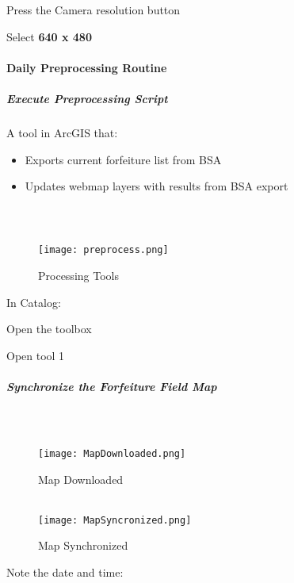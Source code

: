 \documentclass[class=article , crop=false, titlepage, twoside, multi={itemize, figure, verbatim}, float=false]{standalone}
\begin{document}
\noindent Press the \Large Camera resolution \normalsize button\\
\vspace{3in}

\noindent Select \textbf{\LARGE 640 x 480}\\
\clearpage
\paragraph{Daily Preprocessing Routine}

\subparagraph{Execute Preprocessing Script}A tool in ArcGIS that:

\begin{itemize}

\item Exports current forfeiture list from BSA
\item Updates webmap layers with results from BSA export

\end{itemize}

\subparagraph*{\\}
\begin{wrapfigure}{r}{0.75\textwidth}
\centering
\texttt{[image: preprocess.png]}
\caption{Processing Tools}
\end{wrapfigure}
In Catalog:\\
\vspace{1in}

\noindent Open the toolbox\\
\vspace{1in}

\noindent Open tool 1\\


\clearpage
\subparagraph{Synchronize the Forfeiture Field Map\\}

\subparagraph*{\texorpdfstring{\\}{}}
\begin{wrapfigure}{r}{0.5\textwidth}
\centering
\texttt{[image: MapDownloaded.png]}
\caption{Map Downloaded}
\vspace{.25in}
\HRule \\[.4cm] %
\vspace{.25in}
\texttt{[image: MapSyncronized.png]}
\caption{Map Synchronized}
\end{wrapfigure}
\Large Note the date and time:
\vspace{1.5in}
\end{document}

